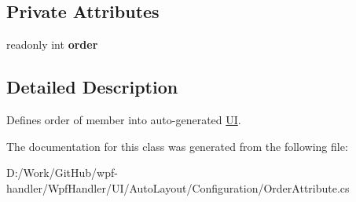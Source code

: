 \subsection*{Private Attributes}
\begin{DoxyCompactItemize}
\item 
\mbox{\label{class_wpf_handler_1_1_u_i_1_1_auto_layout_1_1_configuration_1_1_order_attribute_a3a9164418c248a5bd362cf40f69f5a9c}} 
readonly int {\bfseries order}
\end{DoxyCompactItemize}


\subsection{Detailed Description}
Defines order of member into auto-\/generated \mbox{\hyperlink{namespace_wpf_handler_1_1_u_i}{UI}}. 



The documentation for this class was generated from the following file\+:\begin{DoxyCompactItemize}
\item 
D\+:/\+Work/\+Git\+Hub/wpf-\/handler/\+Wpf\+Handler/\+U\+I/\+Auto\+Layout/\+Configuration/Order\+Attribute.\+cs\end{DoxyCompactItemize}
